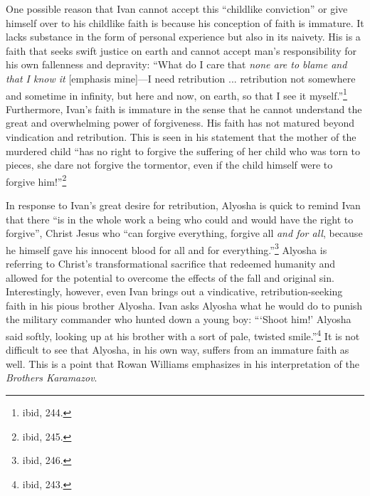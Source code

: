 One possible reason that Ivan cannot accept this ``childlike conviction'' or give himself over to his childlike faith is because his conception of faith is immature. It lacks substance in the form of personal experience but also in its naivety. His is a faith that seeks swift justice on earth and cannot accept man's responsibility for his own fallenness and depravity: ``What do I care that \emph{none are to blame and that I know it} [emphasis mine]---I need retribution ... retribution not somewhere and sometime in infinity, but here and now, on earth, so that I see it myself.''\footnote{ibid, 244.} Furthermore, Ivan's faith is immature in the sense that he cannot understand the great and overwhelming power of forgiveness. His faith has not matured beyond vindication and retribution. This is seen in his statement that the mother of the murdered child ``has no right to forgive the suffering of her child who was torn to pieces, she dare not forgive the tormentor, even if the child himself were to forgive him!''\footnote{ibid, 245.}

In response to Ivan's great desire for retribution, Alyosha is quick to remind Ivan that there ``is in the whole work a being who could and would have the right to forgive'', Christ Jesus who ``can forgive everything, forgive all \emph{and for all}, because he himself gave his innocent blood for all and for everything.''\footnote{ibid, 246.} Alyosha is referring to Christ's transformational sacrifice that redeemed humanity and allowed for the potential to overcome the effects of the fall and original sin. Interestingly, however, even Ivan brings out a vindicative, retribution-seeking faith in his pious brother Alyosha. Ivan asks Alyosha what he would do to punish the military commander who hunted down a young boy: ```Shoot him!' Alyosha said softly, looking up at his brother with a sort of pale, twisted smile.''\footnote{ibid, 243.} It is not difficult to see that Alyosha, in his own way, suffers from an immature faith as well. This is a point that Rowan Williams emphasizes in his interpretation of the \emph{Brothers Karamazov}.

